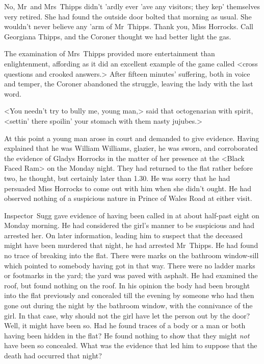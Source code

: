 No, Mr~and Mrs~Thipps didn't 'ardly ever 'ave any visitors; they kep' themselves very retired. She had found the outside door bolted that morning as usual. She wouldn't never believe any 'arm of Mr~Thipps. Thank you, Miss Horrocks. Call Georgiana Thipps, and the Coroner thought we had better light the gas.

The examination of Mrs~Thipps provided more entertainment than enlightenment, affording as it did an excellent example of the game called <cross questions and crooked answers.> After fifteen minutes' suffering, both in voice and temper, the Coroner abandoned the struggle, leaving the lady with the last word.

<You needn't try to bully me, young man,> said that octogenarian with spirit, <settin' there spoilin' your stomach with them nasty jujubes.>

At this point a young man arose in court and demanded to give evidence. Having explained that he was William Williams, glazier, he was sworn, and corroborated the evidence of Gladys Horrocks in the matter of her presence at the <Black Faced Ram> on the Monday night. They had returned to the flat rather before two, he thought, but certainly later than 1.30. He was sorry that he had persuaded Miss Horrocks to come out with him when she didn't ought. He had observed nothing of a suspicious nature in Prince of Wales Road at either visit.

Inspector~Sugg gave evidence of having been called in at about half-past eight on Monday morning. He had considered the girl's manner to be suspicious and had arrested her. On later information, leading him to suspect that the deceased might have been murdered that night, he had arrested Mr~Thipps. He had found no trace of breaking into the flat. There were marks on the bathroom window-sill which pointed to somebody having got in that way. There were no ladder marks or footmarks in the yard; the yard was paved with asphalt. He had examined the roof, but found nothing on the roof. In his opinion the body had been brought into the flat previously and concealed till the evening by someone who had then gone out during the night by the bathroom window, with the connivance of the girl. In that case, why should not the girl have let the person out by the door? Well, it might have been so. Had he found traces of a body or a man or both having been hidden in the flat? He found nothing to show that they might \emph{not} have been so concealed. What was the evidence that led him to suppose that the death had occurred that night?

